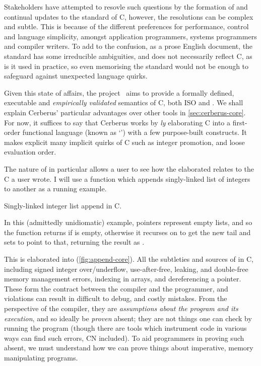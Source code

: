 Stakeholders have attempted to resovle such questions by the formation of and
continual updates to the  standard of C,\cite{isoC1990} however, the
resolutions can be complex and subtle. This is because of the different
preferences for performance, control and language simplicity, amongst
application programmers, systems programmers and compiler writers. To add to
the confusion, as a prose English document, the standard has some irreducible
ambiguities, and does not necessarily reflect  C, as is it
used in practice, so even memorising the standard would not be enough to
safeguard against unexpected language quirks.

Given this state of affairs, the 
project~ aims to provide a formally defined,
executable and \emph{empirically validated} semantics of C, both ISO and . We shall explain Cerberus' particular advantages over other tools in
\cref{sec:cerberus-core}. For now, it suffices to say that Cerberus works by
\emph{ly} elaborating C into a first-order functional
language (known as `') with a few purpose-built constructs. It
makes explicit many implicit quirks of C such as integer promotion,  and
loose evaluation order.

The  nature of in particular allows a user to see how the
elaborated  relates to the C a user wrote. I will use a function which
appends singly-linked list of integers to another as a running example.

\begin{marginfigure}
    \centering
    \caption{Singly-linked integer list append in C.}\label{fig:append-c}
\end{marginfigure}%

In this (admittedly unidiomatic) example,  pointers represent
empty lists, and so the function returns  if  is empty,
otherwise it recurses on  to get the new tail
 and sets  to point to that,  returning the
result as .

This is elaborated into  (\cref{fig:append-core}). All the
subtleties and sources of  in C, including signed integer over/underflow,
use-after-free, leaking, and double-free memory management errors,
 indexing in arrays, and dereferencing a 
pointer. These form the contract between the compiler and the programmer, and
violations can result in difficult to debug, and costly mistakes. From the
perspective of the compiler, they are \emph{assumptions about the program and
its execution}, and so ideally be \emph{proven} absent; they are not things one
can check by running the program (though there are tools which instrument code
in various ways can find such errors, CN included). To aid programmers in
proving such  absent, we must understand how we can prove things about
imperative, memory manipulating programs.

